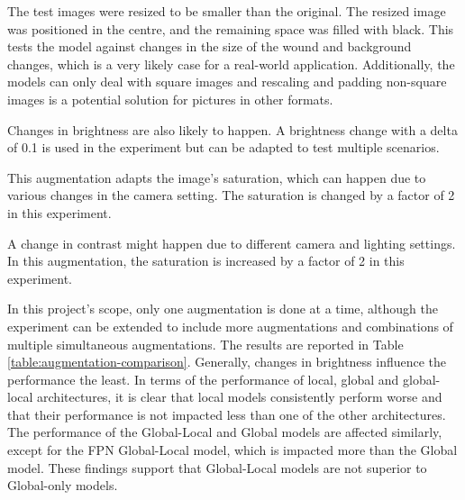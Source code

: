 \begin{description}[leftmargin=10px]
	\item[Embed] The test images were resized to be smaller than the original. The resized image was positioned in the centre, and the remaining space was filled with black. This tests the model against changes in the size of the wound and background changes, which is a very likely case for a real-world application. Additionally, the models can only deal with square images and rescaling and padding non-square images is a potential solution for pictures in other formats.
	\item[Brightness] Changes in brightness are also likely to happen. A brightness change with a delta of 0.1 is used in the experiment but can be adapted to test multiple scenarios.
	\item[Saturation] This augmentation adapts the image's saturation, which can happen due to various changes in the camera setting. The saturation is changed by a factor of 2 in this experiment.
	\item[Contrast] A change in contrast might happen due to different camera and lighting settings. In this augmentation, the saturation is increased by a factor of 2 in this experiment. 
\end{description}

In this project's scope, only one augmentation is done at a time, although the experiment can be extended to include more augmentations and combinations of multiple simultaneous augmentations. The results are reported in Table \ref{table:augmentation-comparison}. Generally, changes in brightness influence the performance the least. In terms of the performance of local, global and global-local architectures, it is clear that local models consistently perform worse and that their performance is not impacted less than one of the other architectures. The performance of the Global-Local and Global models are affected similarly, except for the FPN Global-Local model, which is impacted more than the Global model. These findings support that Global-Local models are not superior to Global-only models.

